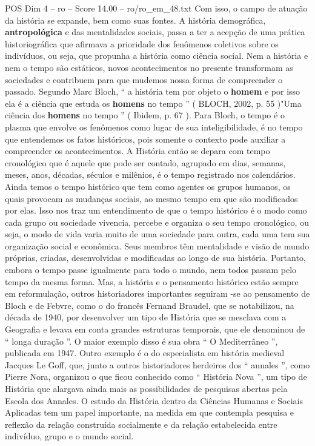 \begin{textsample}{POS Dim 4 – ro – Score 14.00 – ro/ro\_em\_48.txt}
Com isso, o campo de atuação da história se expande, bem como suas fontes.
A história demográfica, \textbf{antropológica} e das mentalidades sociais, passa a ter a acepção de uma prática historiográfica que afirmava a prioridade dos fenômenos coletivos sobre os indivíduos, ou seja, que propunha a história como ciência social.
Nem a história e nem o tempo são estáticos, novos acontecimentos no presente transformam as sociedades e contribuem para que mudemos nossa forma de compreender o passado.
Segundo Marc Bloch, “ a história tem por objeto o \textbf{homem} e por isso ela é a ciência que estuda os \textbf{homens} no tempo ” ( BLOCH, 2002, p. 55 )"Uma ciência dos \textbf{homens} no tempo ” ( Ibidem, p. 67 ).
Para Bloch, o tempo é o plasma que envolve os fenômenos como lugar de sua inteligibilidade, é no tempo que entendemos os fatos históricos, pois somente o contexto pode auxiliar a compreender os acontecimentos.
A História então se depara com tempo cronológico que é aquele que pode ser contado, agrupado em dias, semanas, meses, anos, décadas, séculos e milênios, é o tempo registrado nos calendários.
Ainda temos o tempo histórico que tem como agentes os grupos humanos, os quais provocam as mudanças sociais, ao mesmo tempo em que são modificados por elas.
Isso nos traz um entendimento de que o tempo histórico é o modo como cada grupo ou sociedade vivencia, percebe e organiza o seu tempo cronológico, ou seja, o modo de vida varia muito de uma sociedade para outra, cada uma tem sua organização social e econômica.
Seus membros têm mentalidade e visão de mundo próprias, criadas, desenvolvidas e modificadas ao longo de sua história.
Portanto, embora o tempo passe igualmente para todo o mundo, nem todos passam pelo tempo da mesma forma.
Mas, a história e o pensamento histórico estão sempre em reformulação, outros historiadores importantes seguiram -se ao pensamento de Bloch e de Febvre, como o do francês Fernand Braudel, que se notabilizou, na década de 1940, por desenvolver um tipo de História que se mesclava com a Geografia e levava em conta grandes estruturas temporais, que ele denominou de “ longa duração ”.
O maior exemplo disso é sua obra “ O Mediterrâneo ”, publicada em 1947.
Outro exemplo é o do especialista em história medieval Jacques Le Goff, que, junto a outros historiadores herdeiros dos “ annales ”, como Pierre Nora, organizou o que ficou conhecido como “ História Nova ”, um tipo de História que alargava ainda mais as possibilidades de pesquisas abertas pela Escola dos Annales.
O estudo da História dentro da Ciências Humanas e Sociais Aplicadas tem um papel importante, na medida em que contempla pesquisa e reflexão da relação construída socialmente e da relação estabelecida entre indivíduo, grupo e o mundo social.

\end{textsample}

